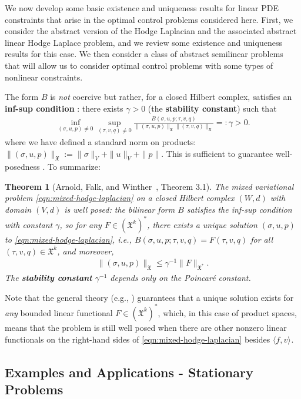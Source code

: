 \documentclass{article}
\newtheorem{theorem}{Theorem}[section]
\newcommand{\f}[1]{\mathfrak{#1}}
\newcommand{\aip}[2][]{\langle #2 \rangle_{#1}}
\newcommand{\keyterm}[2][]{\textbf{#2}}
\begin{document}
We now develop some basic existence and uniqueness results for linear PDE constraints that arise in the optimal control problems considered here.
First, we consider the abstract version of the Hodge Laplacian and the associated abstract linear Hodge Laplace problem, and we review some existence and uniqueness results for this case.
We then consider a class of abstract semilinear problems that will allow us to consider optimal control problems with some types of nonlinear constraints.

The form $B$ is \emph{not} coercive but rather, for a closed Hilbert complex, satisfies an \keyterm{inf-sup condition} \cite{arnold2010finite,Babuska.I1971}:
there exists $\gamma > 0$ (the \keyterm{stability constant}) such that
\begin{gather*}
	\inf_{(\sigma,u,p)\neq 0} \sup_{(\tau,v,q)\neq 0} \frac{B(\sigma,u,p;\tau,v,q)}{\| (\sigma,u,p) \|_{\f X} \|(\tau, v, q)\|_{\f X}} =: \gamma > 0.
\end{gather*}
where we have defined a standard norm on products: $\|(\sigma,u,p)\|_{\f X} := \|\sigma\|_{V} + \|u\|_{V} + \|p\|$.
This is sufficient to guarantee well-posedness \cite{Babuska.I1971}. To summarize:
\begin{theorem}[Arnold, Falk, and Winther~\cite{arnold2010finite}, Theorem 3.1]\label{thm:cont-prob-wellposed}
	The mixed variational problem \eqref{eqn:mixed-hodge-laplacian} on a closed Hilbert complex $(W,d)$ with domain $(V,d)$ is well posed:
	the bilinear form $B$ satisfies the inf-sup condition with constant $\gamma$, so for any $F \in  (\f X^{k})^{*}$,
	there exists a unique solution $(\sigma,u,p)$ to \eqref{eqn:mixed-hodge-laplacian}, i.e., $B(\sigma,u,p;\tau,v,q) = F(\tau,v,q)$ for all $(\tau,v,q)\in\f X^{k}$, and moreover,
	\begin{gather*}
		\|(\sigma,u,p)\|_{\f X} \leq  \gamma^{-1} \|F\|_{\f X^{*}}.
	\end{gather*}
	The \keyterm{stability constant} $\gamma^{-1}$ depends only on the Poincar\'e constant.
\end{theorem}
Note that the general theory (e.g., \cite{Babuska.I1971,Ev98}) guarantees that a unique solution exists for \emph{any} bounded linear functional $F \in (\f X^{k})^{*}$,
which, in this case of product spaces, means that the problem is still well posed when there are other nonzero linear functionals on the right-hand sides of \eqref{eqn:mixed-hodge-laplacian} besides $\aip{f,v}$.



\subsection{Examples and Applications - Stationary Problems}
\end{document}

